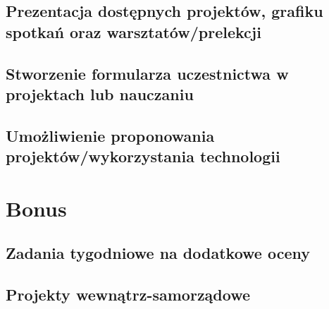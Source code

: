 \documentclass[9pt,a4paper]{report}
\begin{document}
\section{Prezentacja dostępnych projektów, grafiku spotkań oraz warsztatów/prelekcji}
\section{Stworzenie formularza uczestnictwa w projektach lub nauczaniu}
\section{Umożliwienie proponowania projektów/wykorzystania technologii}

\chapter{Bonus}

\section{Zadania tygodniowe na dodatkowe oceny}
\section{Projekty wewnątrz-samorządowe}
\end{document}
